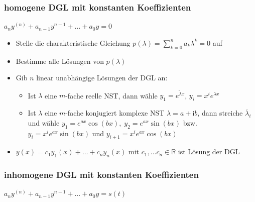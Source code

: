 \documentclass[6pt,a4paper]{scrartcl}
\renewcommand{\i}{\ensuremath{\mathrm{i}}}										%
\newcommand{\R}{\ensuremath{\mathbb R}}
\begin{document}
\begin{multicols*}{4}
\subsubsection{homogene DGL mit konstanten Koeffizienten}
$a_n y^{(n)} + a_{n-1} y^{n-1} + \ldots + a_0 y = 0$
\begin{itemize}\itemsep0pt 
	\item Stelle die charakteristische Gleichung $p(\lambda) = \sum^n_{k=0} a_k \lambda^k = 0$ auf
	\item Bestimme alle Lösungen von $p(\lambda)$
	\item Gib $n$ linear unabhängige Lösungen der DGL an:
	\begin{itemize}\itemsep0pt 
		\item 	Ist $ \lambda$ eine $m$-fache reelle NST, dann wähle $y_1 = e^{\tilde \lambda x}$, \quad $y_i = x^i e^{ \lambda x}$\\
		\item Ist $ \lambda$ eine $m$-fache konjugiert komplexe NST $\lambda = a + \i b$, dann streiche $\overline \lambda_i$ und wähle $y_1 = e^{ax} \cos (bx),\; y_2 = e^{ax} \sin (bx)$ bzw. $y_i = x^i e^{ax} \sin (bx)$ und $y_{i+1} =  x^i e^{ax} \cos (bx)$
	\end{itemize}
	\item $y(x) = c_1 y_1 (x) + \ldots + c_n y_n (x)$ mit $c_1, \ldots c_n \in \R$ ist Lösung der DGL
\end{itemize}

\subsubsection{inhomogene DGL mit konstanten Koeffizienten}
$a_n y^{(n)} + a_{n-1} y^{n-1} + \ldots + a_0 y = s(t)$


\end{multicols*}
\end{document}
